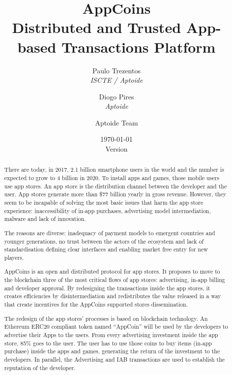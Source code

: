 \documentclass[12pt, a4paper, titlepage]{article}
\title{AppCoins\\ Distributed and Trusted App-based Transactions Platform}
\author{\small Paulo Trezentos  \\
  {\em  ISCTE / Aptoide}  \\
  \and 
\small  Diogo Pires \\
  {\em Aptoide} \\
  \and
  Aptoide Team
  }
\date{\today\\\normalsize Version \versionnumber}
\begin{document}
\maketitle


\begin{abstract}

There are today, in 2017, 2.1 billion smartphone users in the world and the number is expected to grow to  4 billion in 2020. To install apps and games, those mobile users use app stores. An app store is the distribution channel between the developer and the user. App stores generate more than \$77 billion yearly in gross revenue.  However, they seem to be incapable of solving the most basic issues that harm the app store experience: inaccessibility of in-app purchases, advertising model intermediation, malware and lack of innovation.

\medskip

The reasons are diverse: inadequacy of payment models to emergent countries and younger generations, no trust between the actors of the ecosystem and lack of standardisation defining clear interfaces and enabling market free entry for new players.

\medskip

AppCoins is an open and distributed protocol for app stores. It proposes to move to the blockchain three of the most critical flows of app stores: advertising, in-app billing and developer approval. By redesigning the transactions inside the app stores, it creates efficiencies by disintermediation and redistributes the value released in a way that create incentives for the AppCoins supported stores dissemination.

\medskip

The redesign of the app stores' processes is based on blockchain technology. An Ethereum ERC20 compliant token named ``AppCoin'' will be used by the developers to advertise their Apps to the users. From every advertising investment inside the app store, 85\% goes to the user. The user has to use those coins to buy items (in-app purchase) inside the apps and games, generating the return of the investment to the developers. In parallel, the Advertising and IAB transactions are used to establish the reputation of the developer.


\end{abstract}
\end{document}
